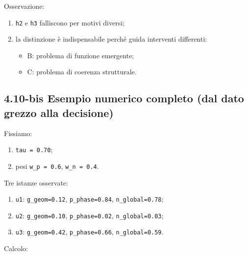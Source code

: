 Osservazione:

\begin{enumerate}
\def\labelenumi{\arabic{enumi}.}
\tightlist
\item
  \texttt{h2} e \texttt{h3} falliscono per motivi diversi;
\item
  la distinzione è indispensabile perché guida interventi differenti:

  \begin{itemize}
  \tightlist
  \item
    B: problema di funzione emergente;
  \item
    C: problema di coerenza strutturale.
  \end{itemize}
\end{enumerate}

\subsection{4.10-bis Esempio numerico completo (dal dato grezzo alla decisione)}

Fissiamo:

\begin{enumerate}
\def\labelenumi{\arabic{enumi}.}
\tightlist
\item
  \texttt{tau\ =\ 0.70};
\item
  pesi \texttt{w\_p\ =\ 0.6}, \texttt{w\_n\ =\ 0.4}.
\end{enumerate}

Tre istanze osservate:

\begin{enumerate}
\def\labelenumi{\arabic{enumi}.}
\tightlist
\item
  \texttt{u1}: \texttt{g\_geom=0.12}, \texttt{p\_phase=0.84}, \texttt{n\_global=0.78};
\item
  \texttt{u2}: \texttt{g\_geom=0.10}, \texttt{p\_phase=0.02}, \texttt{n\_global=0.03};
\item
  \texttt{u3}: \texttt{g\_geom=0.42}, \texttt{p\_phase=0.66}, \texttt{n\_global=0.59}.
\end{enumerate}

Calcolo:

